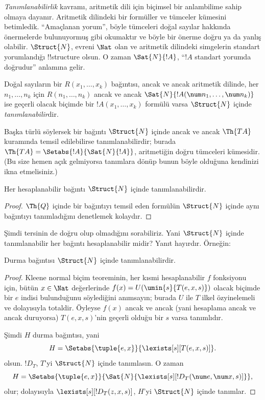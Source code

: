 \documentclass[../../../include/open-logic-section]{subfiles}
\begin{document}


\emph{Tanımlanabilirlik} kavramı, aritmetik dili için biçimsel bir anlambilime
sahip olmaya dayanır. Aritmetik dilindeki bir formüller ve tümceler kümesini
betimledik. ``Amaçlanan yorum'', böyle tümceleri doğal sayılar hakkında
önermelerde bulunuyormuş gibi okumaktır ve böyle bir önerme doğru ya da yanlış
olabilir. $\Struct{N}$, evreni $\Nat$ olan ve aritmetik dilindeki simgelerin
standart yorumlandığı !!{structure} olsun. O zaman $\Sat{N}{!A}$, ``$!A$
standart yorumda doğrudur'' anlamına gelir.

\begin{defn}
Doğal sayıların bir $R(x_1,\dots,x_k)$ bağıntısı, ancak ve ancak aritmetik
dilinde, her $n_1,\dots,n_k$ için $R(n_1,\dots,n_k)$ ancak ve ancak
$\Sat{N}{!A(\num n_1,\dots,\num n_k)}$ ise geçerli olacak biçimde bir
$!A(x_1,\dots,x_k)$ formülü varsa $\Struct{N}$ içinde \emph{tanımlanabilir}dir.
\end{defn}

Başka türlü söylersek bir bağıntı $\Struct{N}$ içinde ancak ve ancak
$\Th{TA}$ kuramında temsil edilebilirse tanımlanabilirdir; burada
$\Th{TA} = \Setabs{!A}{\Sat{N}{!A}}$, aritmetiğin doğru tümceleri kümesidir.
(Bu size hemen açık gelmiyorsa tanımlara dönüp bunun böyle olduğuna kendinizi
ikna etmelisiniz.)

\begin{lem}
Her hesaplanabilir bağıntı $\Struct{N}$ içinde tanımlanabilirdir.
\end{lem}

\begin{proof}
$\Th{Q}$ içinde bir bağıntıyı temsil eden formülün $\Struct{N}$ içinde aynı
bağıntıyı tanımladığını denetlemek kolaydır.
\end{proof}

Şimdi tersinin de doğru olup olmadığını sorabiliriz. Yani $\Struct{N}$ içinde
tanımlanabilir her bağıntı hesaplanabilir midir? Yanıt hayırdır. Örneğin:

\begin{lem}
Durma bağıntısı $\Struct{N}$ içinde tanımlanabilirdir.
\end{lem}

\begin{proof}
Kleene normal biçim teoreminin, her kısmi hesaplanabilir $f$ fonksiyonu için,
bütün $x \in \Nat$ değerlerinde $f(x)=U(\umin{s}{T(e,x,s)})$ olacak biçimde
bir $e$ indisi bulunduğunu söylediğini anımsayın; burada $U$ ile $T$ ilkel
özyinelemeli ve dolayısıyla totaldir. Öyleyse $f(x)$ ancak ve ancak
(yani hesaplama ancak ve ancak duruyorsa) $T(e,x,s)$'nin geçerli olduğu bir
$s$ varsa tanımlıdır.

Şimdi $H$ durma bağıntısı, yani
\[
H = \Setabs{\tuple{e,x}}{\lexists[s][T(e, x, s)]}.
\]
olsun. $!D_T$, $T$'yi $\Struct{N}$ içinde tanımlasın. O zaman
\[
H = \Setabs{\tuple{e,x}}{\Sat{N}{\lexists[s][!D_T(\num e, \num x, s)]}},
\]
olur; dolayısıyla $\lexists[s][!D_T(z,x,s)]$, $H$'yi $\Struct{N}$ içinde
tanımlar.
\end{proof}
\end{document}
